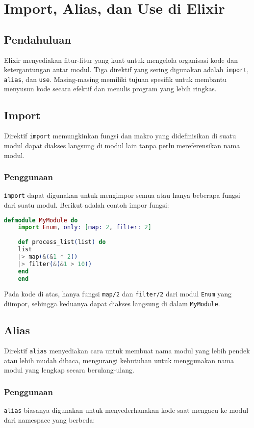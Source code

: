 \chapter{Import, Alias, dan Use di Elixir}

\section{Pendahuluan}
Elixir menyediakan fitur-fitur yang kuat untuk mengelola organisasi kode dan ketergantungan antar modul. Tiga direktif yang sering digunakan adalah \texttt{import}, \texttt{alias}, dan \texttt{use}. Masing-masing memiliki tujuan spesifik untuk membantu menyusun kode secara efektif dan menulis program yang lebih ringkas.

\section{Import}
Direktif \texttt{import} memungkinkan fungsi dan makro yang didefinisikan di suatu modul dapat diakses langsung di modul lain tanpa perlu mereferensikan nama modul.

\subsection{Penggunaan}
\texttt{import} dapat digunakan untuk mengimpor semua atau hanya beberapa fungsi dari suatu modul. Berikut adalah contoh impor fungsi:

\begin{lstlisting}[language=Elixir]
	defmodule MyModule do
	import Enum, only: [map: 2, filter: 2]
	
	def process_list(list) do
	list
	|> map(&(&1 * 2))
	|> filter(&(&1 > 10))
	end
	end
\end{lstlisting}

Pada kode di atas, hanya fungsi \texttt{map/2} dan \texttt{filter/2} dari modul \texttt{Enum} yang diimpor, sehingga keduanya dapat diakses langsung di dalam \texttt{MyModule}.

\section{Alias}
Direktif \texttt{alias} menyediakan cara untuk membuat nama modul yang lebih pendek atau lebih mudah dibaca, mengurangi kebutuhan untuk menggunakan nama modul yang lengkap secara berulang-ulang.

\subsection{Penggunaan}
\texttt{alias} biasanya digunakan untuk menyederhanakan kode saat mengacu ke modul dari namespace yang berbeda:

